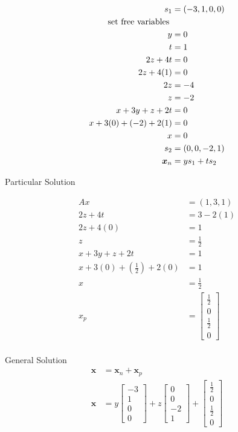 \documentclass[main.tex]{subfiles}
\begin{document}
\begin{enumerate}
$$\begin{aligned}
    s_{1}&=(-3,1,0,0)\\
    \text{ set free variables } & \\
    y &= 0 \\
    t &= 1 \\
    2z+4 t &=0 \\
    2z+4(1) &=0 \\
    2z &=-4 \\
    z &=-2 \\
    x+3 y+z+2 t &=0 \\
    x+3(0)+(-2)+2(1) &=0 \\
    x &=0 \\
    s_{2}&=(0,0,-2,1)\\
    \bm{x}_{n}&=y s_{1}+t s_{2}
    \end{aligned}\\
    $$
    
    Particular Solution
    
    $$
    \begin{aligned}
    A x &=(1,3,1)\\
    2 z+4 t &=3-2(1) \\
    2 z+4(0) &=1 \\
    z &=\frac{1}{2} \\
    x+3 y+z+2 t &=1 \\
    x+3(0)+\left(\frac{1}{2}\right)+2(0) &=1 \\
    x &=\frac{1}{2}\\
    x_{p} &= \left[\begin{array}{c}
    \frac{1}{2} \\
    0 \\
    \frac{1}{2} \\
    0
    \end{array}\right]\\
    \end{aligned}
    $$

    General Solution
    $$
    \begin{aligned}
    \bm{x}&=\bm{x}_{n}+\bm{x}_{p}\\
    \bm{x}&=y\left[\begin{array}{c}
    -3 \\
    1 \\
    0 \\
    0
    \end{array}\right]+z\left[\begin{array}{c}
    0 \\
    0 \\
    -2 \\
    1
    \end{array}\right]+\left[\begin{array}{c}
    \frac{1}{2} \\
    0 \\
    \frac{1}{2} \\
    0
    \end{array}\right]
    \end{aligned}
    $$
    

\end{enumerate}
\end{document}
